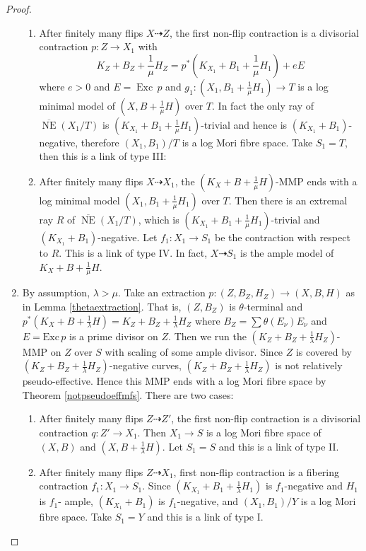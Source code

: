\documentclass[11pt]{amsart}
\begin{document}
\begin{proof}
\begin{enumerate}
\begin{enumerate}
    \item \label{a3}
      After finitely many flips $ X\dashrightarrow Z $, the first non-flip contraction is a divisorial contraction $ p:Z\to X_1$ with 
    \[ K_Z+B_Z+\frac{1}{\mu}H_Z=p^*(K_{X_1}+B_1+\frac{1}{\mu}H_1)+eE \]
    where $ e>0 $ and  $E=\operatorname{Exc}\,p$ and  $g_{1}: (X_1,B_1+\frac{1}{\mu}H_1) \to T$ is a log minimal model of $(X,B+\frac{1}{\mu}H)$ over $T$. In fact the only ray of $ \overline{\operatorname{NE}}(X_1/T) $ is $ (K_{X_1}+B_1+\frac{1}{\mu}H_1) $-trivial and hence is $ (K_{X_1}+B_1) $-negative, therefore $ (X_1,B_1)/T $ is a log Mori fibre space. Take $ S_1=T $, then this is a link of type III:
  \item \label{a4}After finitely many flips $ X\dashrightarrow X_1 $, the $(K_{X}+B+\frac{1}{\mu}H)$-MMP ends with a log minimal model $ (X_1,B_1+\frac{1}{\mu}H_1) $ over $T $. Then there is an extremal ray $R$ of $ \overline{\operatorname{NE}}(X_1/T) $, which is $ (K_{X_1}+B_1+\frac{1}{\mu}H_1) $-trivial and $ (K_{X_1}+B_1) $-negative. Let $ f_1:X_1\to S_1 $ be the contraction with respect to $R$. This is a link of type IV. In fact, $X \dashrightarrow  S_{1}$ is the ample model of $K_{X}+B+\frac{1}{\mu}H$.
  \end{enumerate}
\item\label{b}By assumption, $\lambda>\mu$. Take  an extraction $ p:(Z,B_Z,H_Z)\to (X,B,H) $ as in Lemma \ref{thetaextraction}. That is,  $ (Z,B_Z) $ is $ \theta $-terminal and $ p^*(K_X+B+\frac{1}{\lambda}H)=K_Z+B_Z+\frac{1}{\lambda}H_Z $ where $ B_Z=\sum\theta(E_\nu)E_\nu $ and $ E=\mathrm{Exc}\,p $ is a prime divisor on $ Z $.
  Then we run the $ (K_Z+B_Z+\frac{1}{\lambda}H_Z) $-MMP on $ Z $ over $ S $ with scaling of some ample divisor. Since $Z$ is covered by $ (K_Z+B_Z+\frac{1}{\lambda}H_Z) $-negative curves, $ (K_Z+B_Z+\frac{1}{\lambda}H_Z) $ is not relatively pseudo-effective. Hence this MMP ends with a log Mori fibre space by Theorem \ref{notpseudoeffmfs}. There are two cases:
  \begin{enumerate}
    \item \label{b1}After finitely many flips $ Z\dashrightarrow Z' $, the first non-flip contraction is a divisorial contraction $ q:Z'\to X_1 $. Then $ X_{1}\to S $ is a log Mori fibre space of $(X,B)$ and $(X,B+\frac{1}{\lambda}H)$.  Let $ S_1=S $ and this is a link of type II.
    \item\label{b2}After finitely many flips $ Z\dashrightarrow X_1 $, first non-flip contraction is a fibering contraction $ f_1:X_1\to S_{1}$. Since $ (K_{X_1}+B_1+\frac{1}{\lambda}H_1) $ is $ f_1 $-negative and $ H_1 $ is $ f_1 $- ample, $ (K_{X_1}+B_1) $ is $ f_1 $-negative, and $ (X_1,B_1)/Y $ is a log Mori fibre space.  Take $ S_1=Y $ and this is a link of type I.
  \end{enumerate} 
\end{enumerate}
\end{proof}
\end{document}
